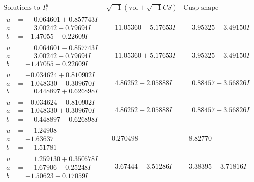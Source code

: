 \documentclass[1p]{elsarticle_modified}
\theoremstyle{definition}
\newcommand{\I}{\sqrt{-1}}
\begin{document}
$$\begin{array}{c|c|c}  
\text{Solutions to }I^u_{1}& \I (\text{vol} + \sqrt{-1}CS) & \text{Cusp shape}\\
 \hline 
\begin{aligned}
u &= \phantom{-}0.064601 + 0.857743 I \\
a &= \phantom{-}3.00242 + 0.79694 I \\
b &= -1.47055 + 0.22609 I\end{aligned}
 & \phantom{-}11.05360 - 5.17653 I & \phantom{-}3.95325 + 3.49150 I \\ \hline\begin{aligned}
u &= \phantom{-}0.064601 - 0.857743 I \\
a &= \phantom{-}3.00242 - 0.79694 I \\
b &= -1.47055 - 0.22609 I\end{aligned}
 & \phantom{-}11.05360 + 5.17653 I & \phantom{-}3.95325 - 3.49150 I \\ \hline\begin{aligned}
u &= -0.034624 + 0.810902 I \\
a &= -1.048330 - 0.309670 I \\
b &= \phantom{-}0.448897 + 0.626898 I\end{aligned}
 & \phantom{-}4.86252 + 2.05888 I & \phantom{-}0.88457 - 3.56826 I \\ \hline\begin{aligned}
u &= -0.034624 - 0.810902 I \\
a &= -1.048330 + 0.309670 I \\
b &= \phantom{-}0.448897 - 0.626898 I\end{aligned}
 & \phantom{-}4.86252 - 2.05888 I & \phantom{-}0.88457 + 3.56826 I \\ \hline\begin{aligned}
u &= \phantom{-}1.24908\phantom{ +0.000000I} \\
a &= -1.63637\phantom{ +0.000000I} \\
b &= \phantom{-}1.51781\phantom{ +0.000000I}\end{aligned}
 & -0.270498\phantom{ +0.000000I} & -8.82770\phantom{ +0.000000I} \\ \hline\begin{aligned}
u &= \phantom{-}1.259130 + 0.350678 I \\
a &= \phantom{-}1.67906 + 0.25248 I \\
b &= -1.50623 - 0.17059 I\end{aligned}
 & \phantom{-}3.67444 - 3.51286 I & -3.38395 + 3.71816 I \\ \hline\begin{aligned}

\end{aligned}
\end{array}$$
\end{document}
